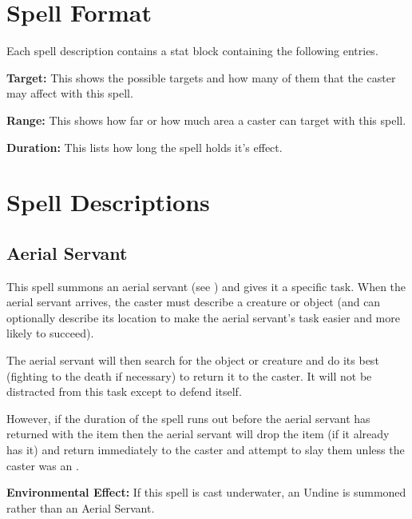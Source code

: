 \begin{multicols*}{2}

\section{Spell Format}
Each spell description contains a stat block containing the following entries.

\textbf{Target:} This shows the possible targets and how many of them that the caster may affect with this spell.

\textbf{Range:} This shows how far or how much area a caster can target with this spell.

\textbf{Duration:} This lists how long the spell holds it’s effect.

\section{Spell Descriptions}\label{sec:Spell Descriptions}
\subsection{Aerial Servant}\label{spell:Aerial Servant}


This spell summons an aerial servant (see ) and gives it a specific task. When the aerial servant arrives, the caster must describe a creature or object (and can optionally describe its location to make the aerial servant’s task easier and more likely to succeed).

The aerial servant will then search for the object or creature and do its best (fighting to the death if necessary) to return it to the caster. It will not be distracted from this task except to defend itself.

However, if the duration of the spell runs out before the aerial servant has returned with the item then the aerial servant will drop the item (if it already has it) and return immediately to the caster and attempt to slay them unless the caster was an .

\textbf{Environmental Effect:} If this spell is cast underwater, an Undine is summoned rather than an Aerial Servant.


\end{multicols*}
